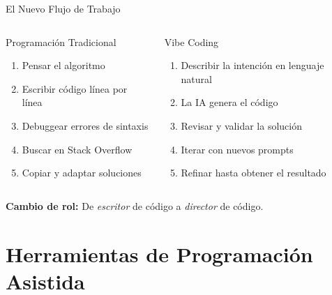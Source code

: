 \documentclass[aspectratio=169]{beamer}
\begin{document}
\begin{frame}{El Nuevo Flujo de Trabajo}
    \begin{columns}[t]
        \begin{alertblock}{Programación Tradicional}
            \begin{enumerate}
                \item Pensar el algoritmo
                \item Escribir código línea por línea
                \item Debuggear errores de sintaxis
                \item Buscar en Stack Overflow
                \item Copiar y adaptar soluciones
            \end{enumerate}
        \end{alertblock}
        
        \begin{exampleblock}{Vibe Coding}
            \begin{enumerate}
                \item Describir la intención en lenguaje natural
                \item La IA genera el código
                \item Revisar y validar la solución
                \item Iterar con nuevos prompts
                \item Refinar hasta obtener el resultado
            \end{enumerate}
        \end{exampleblock}
    \end{columns}
    
    \vspace{0.5cm}
    \centering
    \textbf{Cambio de rol:} De \textit{escritor} de código a \textit{director} de código.
\end{frame}

\section{Herramientas de Programación Asistida}
\end{document}
